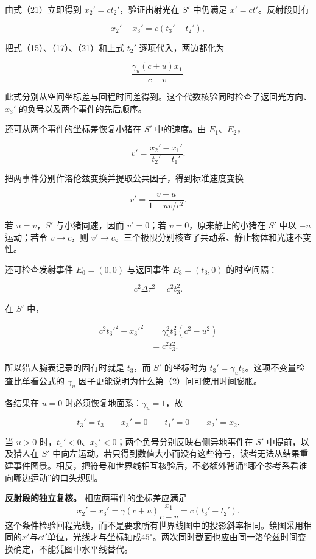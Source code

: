 \documentclass[12pt,a4paper,UTF8]{ctexart}
\begin{document}
由式（21）立即得到 \(x_2'=ct_2'\)，验证出射光在 \(S'\) 中仍满足
\(x'=ct'\)。反射段则有

\[
x_2'-x_3'=c(t_3'-t_2'),
\]

把式（15）、（17）、（21）和上式 \(t_2'\) 逐项代入，两边都化为

\[
\frac{\gamma_u(c+u)x_1}{c-v}.
\]

此式分别从空间坐标差与回程时间差得到。这个代数核验同时检查了返回光方向、\(x_3'\)
的负号以及两个事件的先后顺序。

还可从两个事件的坐标差恢复小猪在 \(S'\) 中的速度。由 \(E_1\)、\(E_2\)，

\[
v'=\frac{x_2'-x_1'}{t_2'-t_1'}.
\]

把两事件分别作洛伦兹变换并提取公共因子，得到标准速度变换

\[
\boxed{v'=\frac{v-u}{1-uv/c^2}}.
\]

若 \(u=v\)，\(S'\) 与小猪同速，因而 \(v'=0\)；若
\(v=0\)，原来静止的小猪在 \(S'\) 中以 \(-u\) 运动；若令 \(v\to c\)，则
\(v'\to c\)。三个极限分别核查了共动系、静止物体和光速不变性。

还可检查发射事件 \(E_0=(0,0)\) 与返回事件 \(E_3=(t_3,0)\) 的时空间隔：

\[
c^2\Delta\tau^2=c^2t_3^2.
\]

在 \(S'\) 中，

\[
\begin{aligned}
c^2t_3'^2-x_3'^2
&=\gamma_u^2t_3^2(c^2-u^2)\\
&=c^2t_3^2.
\end{aligned}
\]

所以猎人腕表记录的固有时就是 \(t_3\)，而 \(S'\) 的坐标时为
\(t_3'=\gamma_ut_3\)。这项不变量检查比单看公式的 \(\gamma_u\)
因子更能说明为什么第（2）问可使用时间膨胀。

各结果在 \(u=0\) 时必须恢复地面系：\(\gamma_u=1\)，故

\[
t_3'=t_3\qquad x_3'=0\qquad t_1'=0\qquad x_2'=x_2.
\]

当 \(u>0\) 时，\(t_1'<0\)、\(x_3'<0\)；两个负号分别反映右侧异地事件在
\(S'\) 中提前，以及猎人在 \(S'\)
中向左运动。若只得到数值大小而没有这些符号，读者无法从结果重建事件图景。相反，把符号和世界线相互核验后，不必额外背诵``哪个参考系看谁向哪边运动''的口头规则。

\textbf{反射段的独立复核。} 相应两事件的坐标差应满足
\[x_2'-x_3'=\gamma(c+u)\frac{x_1}{c-v}
=c(t_3'-t_2').\]
这个条件检验回程光线，而不是要求所有世界线图中的投影斜率相同。绘图采用相同的\(x'\)与\(ct'\)单位，光线才与坐标轴成\(45^\circ\)。两次同时截面也应由同一洛伦兹时间变换确定，不能凭图中水平线替代。
\end{document}
